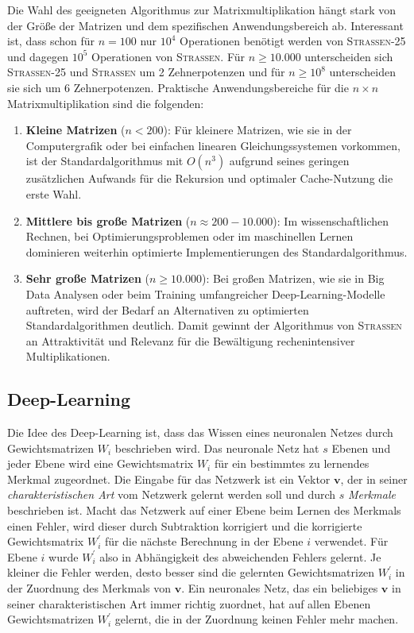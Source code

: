 \documentclass{report}
\numberwithin{equation}{section}
\begin{document}
Die Wahl des geeigneten Algorithmus zur Matrixmultiplikation hängt stark von der Größe der Matrizen und dem spezifischen Anwendungsbereich ab. Interessant ist, dass schon für $n = 100$ nur $10^{4}$ Operationen benötigt werden von \textsc{Strassen-25} und dagegen $10^{5}$ Operationen von \textsc{Strassen}. Für $n \geq 10.000$ unterscheiden sich \textsc{Strassen-25} und \textsc{Strassen} um 2 Zehnerpotenzen und für $n \geq 10^8$ unterscheiden sie sich um 6 Zehnerpotenzen. Praktische Anwendungsbereiche für die $n \times n$ Matrixmultiplikation sind die folgenden:

\begin{enumerate}
	\item \textbf{Kleine Matrizen} ($n < 200$): Für kleinere Matrizen, wie sie in der Computergrafik oder bei einfachen linearen Gleichungssystemen vorkommen, ist der Standardalgorithmus mit $O(n^3)$ aufgrund seines geringen zusätzlichen Aufwands für die Rekursion und optimaler Cache-Nutzung die erste Wahl.
	
	\item \textbf{Mittlere bis große Matrizen} ($n \approx 200 - 10.000$): Im wissenschaftlichen Rechnen, bei Optimierungsproblemen oder im maschinellen Lernen dominieren weiterhin optimierte Implementierungen des Standardalgorithmus.
	
	\item \textbf{Sehr große Matrizen} ($n \ge 10.000$): Bei großen Matrizen, wie sie in Big Data Analysen oder beim Training umfangreicher Deep-Learning-Modelle auftreten, wird der Bedarf an Alternativen zu optimierten Standardalgorithmen deutlich. Damit gewinnt der Algorithmus von \textsc{Strassen} an Attraktivität und Relevanz für die Bewältigung rechenintensiver Multiplikationen.
\end{enumerate}

\subsection{Deep-Learning}
Die Idee des Deep-Learning ist, dass das Wissen eines neuronalen Netzes durch Gewichtsmatrizen $W_i$ beschrieben wird. Das neuronale Netz hat $s$ Ebenen und jeder Ebene wird eine Gewichtsmatrix $W_i$ für ein bestimmtes zu lernendes Merkmal zugeordnet. Die Eingabe für das Netzwerk ist ein Vektor $\boldsymbol{v}$, der in seiner \textit{charakteristischen Art} vom Netzwerk gelernt werden soll und durch $s$ \textit{Merkmale} beschrieben ist. Macht das Netzwerk auf einer Ebene beim Lernen des Merkmals einen Fehler, wird dieser durch Subtraktion korrigiert und die korrigierte Gewichtsmatrix $W^{'}_i$ für die nächste Berechnung in der Ebene $i$ verwendet. Für Ebene $i$ wurde $W^{'}_i$ also in Abhängigkeit des abweichenden Fehlers gelernt. Je kleiner die Fehler werden, desto besser sind die gelernten Gewichtsmatrizen $W^{'}_i$ in der Zuordnung des Merkmals von $\boldsymbol{v}$. Ein neuronales Netz, das ein beliebiges $\boldsymbol{v}$ in seiner charakteristischen Art immer richtig zuordnet, hat auf allen Ebenen Gewichtsmatrizen $W^{'}_i$ gelernt, die in der Zuordnung keinen Fehler mehr machen.
\end{document}
